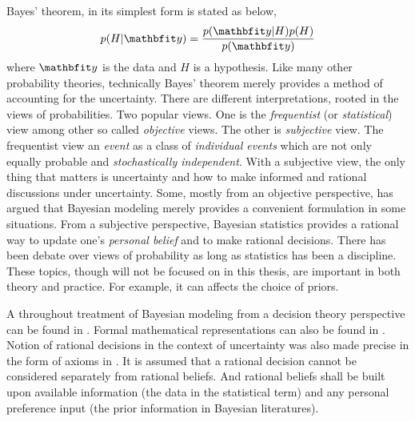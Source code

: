 Bayes' theorem, in its simplest form is stated as below,
\begin{equation}
  p(H|\data) = \frac{p(\data|H)p(H)}{p(\data)} \label{eq:bayes}
\end{equation}
where $\data$ is the data and $H$ is a hypothesis. Like many other probability
theories, technically Bayes' theorem merely provides a method of accounting
for the uncertainty. There are different interpretations, rooted in the views
of probabilities. Two popular views. One is the \emph{frequentist} (or
\emph{statistical}) view among other so called \emph{objective} views. The
other is \emph{subjective} view. The frequentist view an \emph{event} as a
class of \emph{individual events} which are not only equally probable and
\emph{stochastically independent}. With a subjective view, the only thing
that matters is uncertainty and how to make informed and rational discussions
under uncertainty. Some, mostly from an objective perspective, has argued that
Bayesian modeling merely provides a convenient formulation in some situations.
From a subjective perspective, Bayesian statistics provides a rational way to
update one's \emph{personal belief} and to make rational decisions. There has
been debate over views of probability as long as statistics has been a
discipline. These topics, though will not be focused on in this thesis, are
important in both theory and practice. For example, it can affects the choice
of priors.

A throughout treatment of Bayesian modeling from a decision theory perspective
can be found in \cite{Robert:2007tc}. Formal mathematical representations can
also be found in \cite[][sec.~5.1 and sec.~6.1]{Bernardo:1994vd}. Notion of
rational decisions in the context of uncertainty was also made precise in the
form of axioms in \cite{DeFinetti:1974tg,DeFinetti:1975ua}. It is assumed that
a rational decision cannot be considered separately from rational beliefs. And
rational beliefs shall be built upon available information (the data in the
statistical term) and any personal preference input (the prior information in
Bayesian literatures).

